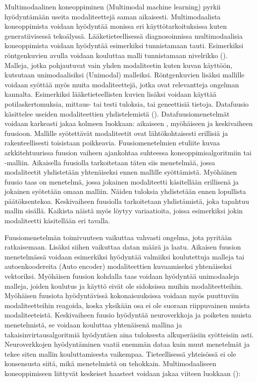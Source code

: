 Multimodaalinen koneoppiminen (Multimodal machine learning) pyrkii hyödyntämään useita modaliteettejä saman aikaisesti. Multimodaalista koneoppimista voidaan hyödyntää monissa eri käyttötarkoituksissa kuten generatiivisessä tekoälyssä. Lääketieteellisessä diagnosoinnissa multimodaalisia koneoppimista voidaan hyödyntää esimerkiksi tunnistamaan tauti. Esimerkiksi röntgenkuvien avulla voidaan kouluttaa malli tunnistamaan nivelrikko (\cite{tiulpin2018automatic}). Malleja, jotka pohjautuvat vain yhden modaliteetin kuten kuvan käyttöön, kutsutaan unimodaalisiksi (Unimodal) malleiksi. Röntgenkuvien lisäksi mallille voidaan syöttää myös muita modaliteettejä, jotka ovat relevantteja ongelman kannalta. Esimerkiksi lääketieteellisten kuvien lisäksi voidaan käyttää potilaskertomuksia, mittaus- tai testi tuloksia, tai geneettisiä tietoja. Datafuusio käsittelee useiden modaliteettien yhdistelemistä (\cite{8269806}). Datafuusiomenetelmät voidaan karkeasti jakaa kolmeen luokkaan: aikaiseen , myöhäiseen ja keskivaiheen fuusioon. Mallille syötettävät modaliteetit ovat lähtökohtaisesti erillisiä ja rakenteellisesti toisistaan poikkeavia. Fuusiomenetelmien etuliite kuvaa arkkitehtuurissa fuusion vaiheen ajankohtaa suhteessa koneoppimisalgoritmiin tai -malliin. Aikaisella fuusiolla tarkoitetaan täten siis menetelmää, jossa modaliteetit yhdistetään yhtenäiseksi ennen mallille syöttämistä. Myöhäinen fuusio taas on menetelmä, jossa jokainen modaliteetti käsitellään erillisenä ja jokainen syötetään omaan malliin. Näiden tuloksia yhdistetään ennen lopullista päätöksentekoa. Keskivaiheen fuusiolla tarkoitetaan yhdistämistä, joka tapahtuu mallin sisällä. Kaikista näistä myös löytyy variaatioita, joissa esimerkiksi jokin modaliteetti käsitellään eri tavalla.

Fuusiomenetelmän toimivuuteen vaikuttaa vahvasti ongelma, jota pyritään ratkaisemaan. Lisäksi siihen vaikuttaa datan määrä ja laatu. Aikaisen fuusion menetelmässä voidaan esimerkiksi hyödyntää valmiiksi koulutettuja malleja tai autoenkoodereita (Auto encoder) modaliteettien kuvaamiseksi yhtenäiseksi vektoriksi. Myöhäisen fuusion kohdalla taas voidaan hyödyntää unimodaaleja malleja, joiden koulutus ja käyttö eivät ole sidoksissa muihin modaliteetteihin. Myöhäisen fuusiota hyödyntävissä kokonaisuuksissa voidaan myös puuttuviin modaliteetteihin reagoida, koska yksikään osa ei ole suoraan riippuvainen muista modaliteeteistä. Keskivaiheen fuusio hyödyntää neuroverkkoja ja poiketen muista menetelmistä, se voidaan kouluttaa yhtenäisenä mallina ja takaisinvirtausalgoritmiä hyödyntäen aina tuloksesta alkuperäisiin syötteisiin asti. Neuroverkkojen hyödyntäminen vaatii enemmän dataa kuin muut menetelmät ja tekee siten mallin kouluttamisesta vaikempaa. Tieteellisessä yhteisössä ei ole konsensusta siitä, mikä menetelmistä on tehokkain. Multimodaaliseen koneoppimiseen liittyvät keskeiset haasteet voidaan jakaa viiteen luokkaan (\cite{8269806}):

